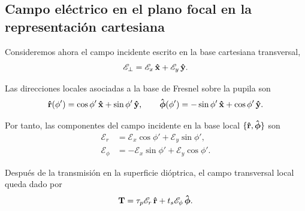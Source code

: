 
\subsection{Campo eléctrico en el plano focal en la representación cartesiana}
\label{subsec:representacion_cartesiana}

Consideremos ahora el campo incidente escrito en la base cartesiana transversal,
\begin{equation}
  \mathscr E_\perp
  =
  \mathscr E_x\,\bm{\hat{\mathbf{x}}}
  +
  \mathscr E_y\,\bm{\hat{\mathbf{y}}}.
\end{equation}

Las direcciones locales asociadas a la base de Fresnel sobre la pupila son
\begin{equation}
\bm{\hat{\mathbf{r}}}(\phi')
=
\cos\phi'\,\bm{\hat{\mathbf{x}}}
+
\sin\phi'\,\bm{\hat{\mathbf{y}}},
\qquad
\bm{\hat{\mathbf{\phi}}}(\phi')
=
-\sin\phi'\,\bm{\hat{\mathbf{x}}}
+
\cos\phi'\,\bm{\hat{\mathbf{y}}}.
\label{eq:cartesian_polar_unit_vectors}
\end{equation}

Por tanto, las componentes del campo incidente en la base local
$\{\bm{\hat{\mathbf{r}}},\bm{\hat{\mathbf{\phi}}}\}$ son
\begin{equation}
\begin{aligned}
  \mathscr E_r
  &=
  \mathscr E_x\cos\phi'
  +
  \mathscr E_y\sin\phi',
  \\
  \mathscr E_\phi
  &=
  -
  \mathscr E_x\sin\phi'
  +
  \mathscr E_y\cos\phi'.
\end{aligned}
\label{eq:cartesian_to_local_fresnel_components}
\end{equation}

Después de la transmisión en la superficie dióptrica, el campo transversal local queda dado por
\begin{equation}
  \vb T
  =
  \tau_p\mathscr E_r\,\bm{\hat{\mathbf{r}}}
  +
  t_s\mathscr E_\phi\,\bm{\hat{\mathbf{\phi}}}.
\label{eq:T_cartesian_local_fresnel}
\end{equation}

